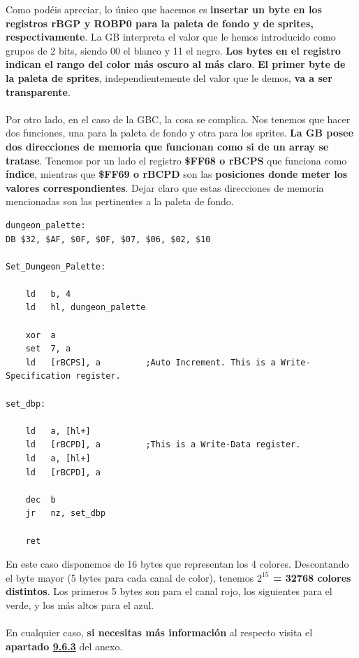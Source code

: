 Como podéis apreciar, lo único que hacemos es \textbf{insertar un byte en los registros rBGP y ROBP0 para la paleta de fondo y de sprites, respectivamente}. La GB interpreta el valor que le hemos introducido como grupos de 2 bits, siendo 00 el blanco y 11 el negro. \textbf{Los bytes en el registro indican el rango del color más oscuro al más claro}. \textbf{El primer byte de la paleta de sprites}, independientemente del valor que le demos, \textbf{va a ser transparente}.
\\ \\
Por otro lado, en el caso de la GBC, la cosa se complica. Nos tenemos que hacer dos funciones, una para la paleta de fondo y otra para los sprites. \textbf{La GB posee dos direcciones de memoria que funcionan como si de un array se tratase}. Tenemos por un lado el registro \textbf{\$FF68 o rBCPS} que funciona como \textbf{índice}, mientras que \textbf{\$FF69 o rBCPD} son las \textbf{posiciones donde meter los valores correspondientes}. Dejar claro que estas direcciones de memoria mencionadas son las pertinentes a la paleta de fondo.

\begin{lstlisting}[caption={Paleta para la GBC}, label={code:palette_GBC}]
dungeon_palette:
DB $32, $AF, $0F, $0F, $07, $06, $02, $10

Set_Dungeon_Palette:

	ld 	 b, 4
	ld 	 hl, dungeon_palette

	xor  a
	set  7, a 			
	ld 	 [rBCPS], a 		;Auto Increment. This is a Write-Specification register.

set_dbp:

	ld 	 a, [hl+]
	ld 	 [rBCPD], a 		;This is a Write-Data register.
	ld 	 a, [hl+]
	ld 	 [rBCPD], a

	dec  b
	jr   nz, set_dbp

	ret
\end{lstlisting}

En este caso disponemos de 16 bytes que representan los 4 colores. Descontando el byte mayor (5 bytes para cada canal de color), tenemos \textbf{$2^{15}$ = 32768 colores distintos}. Los primeros 5 bytes son para el canal rojo, los siguientes para el verde, y los más altos para el azul.
\\ \\
En cualquier caso, \textbf{si necesitas más información} al respecto visita el \textbf{apartado \textbf{\hyperref[anexo:lcd_color]{9.6.3}}} del anexo.

\clearpage

